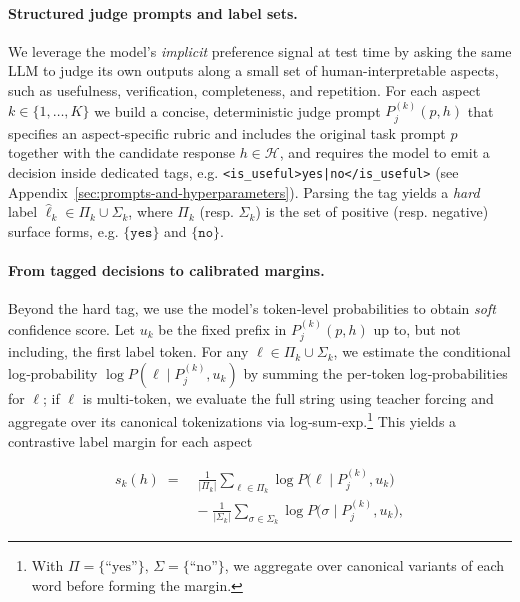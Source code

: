 \documentclass[11pt]{article}
\theoremstyle{plain}
\theoremstyle{definition}
\theoremstyle{remark}
\begin{document}
\paragraph{Structured judge prompts and label sets.} We leverage the model’s \emph{implicit} preference signal at test time by asking the same LLM to judge its own outputs along a small set of human-interpretable aspects, such as usefulness, verification, completeness, and repetition. For each aspect \(k\in\{1,\dots,K\}\) we build a concise, deterministic judge prompt \(P^{(k)}_j(p,h)\) that specifies an aspect‑specific rubric and includes the original task prompt \(p\) together with the candidate response \(h\in\mathcal{H}\), and requires the model to emit a decision inside dedicated tags, e.g. \texttt{<is\_useful>yes|no</is\_useful>} (see Appendix~\ref{sec:prompts-and-hyperparameters}). Parsing the tag yields a \emph{hard} label \(\hat\ell_k\in\Pi_k\cup\Sigma_k\), where \(\Pi_k\) (resp. \(\Sigma_k\)) is the set of positive (resp. negative) surface forms, e.g. \(\{\texttt{yes}\}\) and \(\{\texttt{no}\}\).

\paragraph{From tagged decisions to calibrated margins.} Beyond the hard tag, we use the model’s token‑level probabilities to obtain \emph{soft} confidence score. Let \(u_k\) be the fixed prefix in \(P^{(k)}_j(p,h)\) up to, but not including, the first label token. For any \(\ell\in\Pi_k\cup\Sigma_k\), we estimate the conditional log‑probability \(\log P(\ell\mid P^{(k)}_j,u_k)\) by summing the per‑token log‑probabilities for \(\ell\); if \(\ell\) is multi‑token, we evaluate the full string using teacher forcing and aggregate over its canonical tokenizations via log‑sum‑exp.\footnote{With \(\Pi=\{\text{``yes''}\},\,\Sigma=\{\text{``no''}\}\), we aggregate over canonical variants of each word before forming the margin.} This yields a contrastive label margin for each aspect

  \begin{equation}
  \begin{aligned}
    s_k(h)\;=\;&\frac{1}{|\Pi_k|}\sum_{\ell\in\Pi_k}\log P\!\bigl(\ell\mid P^{(k)}_j,u_k\bigr)\\
    &-\;\frac{1}{|\Sigma_k|}\sum_{\sigma\in\Sigma_k}\log P\!\bigl(\sigma\mid P^{(k)}_j,u_k\bigr),
  \end{aligned}
  \end{equation}
\end{document}
